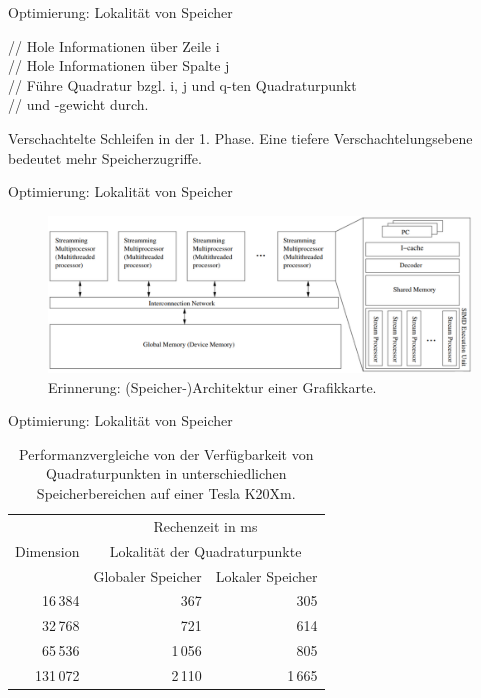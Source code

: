 \documentclass[10pt]{beamer}
\begin{document}
\begin{frame}{Optimierung: Lokalit\"at von Speicher}
  \begin{algorithm}[H]
    {
      {
        // Hole Informationen \"uber Zeile i \\
        {
          // Hole Informationen \"uber Spalte j \\

          {
            // F\"uhre Quadratur bzgl. i, j und q-ten Quadraturpunkt \\
            // und -gewicht durch.
          }
        }
      }      
    }
    \caption{Verschachtelte Schleifen in der 1. Phase. Eine tiefere
             Verschachtelungsebene bedeutet mehr Speicherzugriffe.}
  \end{algorithm}
\end{frame}

\begin{frame}{Optimierung: Lokalit\"at von Speicher}
  \begin{figure}
    \centering
    \includegraphics[width=\linewidth]{figures/fg-gpu_architecture.pdf}
    \caption{Erinnerung: (Speicher-)Architektur einer Grafikkarte.}
  \end{figure}
\end{frame}

\begin{frame}{Optimierung: Lokalität von Speicher}
  \small
  \begin{table}
    \begin{tabular}{rrr} \toprule
      \multirow{3}{*}{Dimension} & \multicolumn{2}{c}{Rechenzeit in ms} \\ \cmidrule{2-3}
      & \multicolumn{2}{c}{Lokalität der Quadraturpunkte} \\ \cmidrule{2-3}
      & Globaler Speicher & Lokaler Speicher \\ \cmidrule{1-3}
       16\,384 &    367 &    305  \\ %
       32\,768 &    721 &    614  \\
       65\,536 & 1\,056 &    805  \\
      131\,072 & 2\,110 & 1\,665 \\
      \bottomrule
    \end{tabular}
    \caption{Performanzvergleiche von der Verfügbarkeit von Quadraturpunkten
             in unterschiedlichen Speicherbereichen auf einer Tesla K20Xm.}
  \end{table}
  \normalsize
\end{frame}
\end{document}
